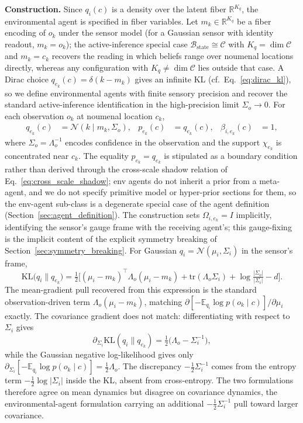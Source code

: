 \documentclass[11pt]{article}
\begin{document}
\textbf{Construction.} Since $q_i(c)$ is a density over the latent fiber $\mathbb{R}^{K_q}$, the environmental agent is specified in fiber variables. Let $m_k \in \mathbb{R}^{K_q}$ be a fiber encoding of $o_k$ under the sensor model (for a Gaussian sensor with identity readout, $m_k = o_k$); the active-inference special case $\mathcal{B}_{\mathrm{state}} \cong \mathcal{C}$ with $K_q = \dim\mathcal{C}$ and $m_k = c_k$ recovers the reading in which beliefs range over noumenal locations directly, whereas any configuration with $K_q \ne \dim\mathcal{C}$ lies outside that case. A Dirac choice $q_{e_k}(c) = \delta(k - m_k)$ gives an infinite KL (cf.\ Eq.~\eqref{eq:dirac_kl}), so we define environmental agents with finite sensory precision and recover the standard active-inference identification in the high-precision limit $\Sigma_o \to 0$. For each observation $o_k$ at noumenal location $c_k$,
\begin{align}
q_{e_k}(c) &= \mathcal{N}(k \mid m_k, \Sigma_o), &
p_{e_k}(c) &= q_{e_k}(c), &
\beta_{i,e_k}(c) &= 1,
\end{align}
where $\Sigma_o = \Lambda_o^{-1}$ encodes confidence in the observation and the support $\chi_{e_k}$ is concentrated near $c_k$. The equality $p_{e_k} = q_{e_k}$ is stipulated as a boundary condition rather than derived through the cross-scale shadow relation of Eq.~\eqref{eq:cross_scale_shadow}; env agents do not inherit a prior from a meta-agent, and we do not specify primitive model or hyper-prior sections for them, so the env-agent sub-class is a degenerate special case of the agent definition (Section~\ref{sec:agent_definition}). The construction sets $\Omega_{i,e_k} = I$ implicitly, identifying the sensor's gauge frame with the receiving agent's; this gauge-fixing is the implicit content of the explicit symmetry breaking of Section~\ref{sec:symmetry_breaking}. For Gaussian $q_i = \mathcal{N}(\mu_i, \Sigma_i)$ in the sensor's frame,
\begin{equation}
\mathrm{KL}\big(q_i \| q_{e_k}\big) = \tfrac{1}{2}\big[(\mu_i - m_k)^\top \Lambda_o (\mu_i - m_k) + \mathrm{tr}(\Lambda_o \Sigma_i) + \log\tfrac{|\Sigma_o|}{|\Sigma_i|} - d\big].
\end{equation}
The mean-gradient pull recovered from this expression is the standard observation-driven term $\Lambda_o(\mu_i - m_k)$, matching $\partial[-\mathbb{E}_{q_i}\log p(o_k \mid c)]/\partial\mu_i$ exactly. The covariance gradient does not match: differentiating with respect to $\Sigma_i$ gives
\begin{equation}
\partial_{\Sigma_i}\mathrm{KL}(q_i \| q_{e_k}) = \tfrac{1}{2}\big(\Lambda_o - \Sigma_i^{-1}\big),
\end{equation}
while the Gaussian negative log-likelihood gives only $\partial_{\Sigma_i}[-\mathbb{E}_{q_i}\log p(o_k \mid c)] = \tfrac{1}{2}\Lambda_o$. The discrepancy $-\tfrac{1}{2}\Sigma_i^{-1}$ comes from the entropy term $-\tfrac{1}{2}\log|\Sigma_i|$ inside the KL, absent from cross-entropy. The two formulations therefore agree on mean dynamics but disagree on covariance dynamics, the environmental-agent formulation carrying an additional $-\tfrac{1}{2}\Sigma_i^{-1}$ pull toward larger covariance.
\end{document}
